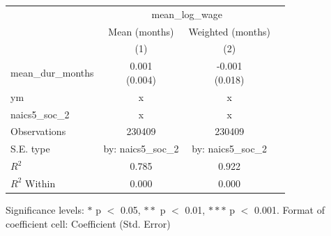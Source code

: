 \renewcommand\cellalign{t}
\begin{threeparttable}
\begin{tabular}{lccc}
\toprule
 & \multicolumn{2}{c}{mean_log_wage} \\
\cmidrule(lr){2-3} 
 & Mean (months) & Weighted (months) \\
 & (1) & (2) \\
\midrule
\addlinespace
mean_dur_months & \makecell{0.001 \\ (0.004)} & \makecell{-0.001 \\ (0.018)} \\
\midrule
\addlinespace
ym & x & x \\
naics5_soc_2 & x & x \\
\midrule
\addlinespace
Observations & 230409 & 230409 \\
S.E. type & by: naics5_soc_2 & by: naics5_soc_2 \\
$R^2$ & 0.785 & 0.922 \\
$R^2$ Within & 0.000 & 0.000 \\
\bottomrule
\end{tabular}
\footnotesize Significance levels: $*$ p $<$ 0.05, $**$ p $<$ 0.01, $***$ p $<$ 0.001. Format of coefficient cell: Coefficient 
 (Std. Error)
\end{threeparttable}